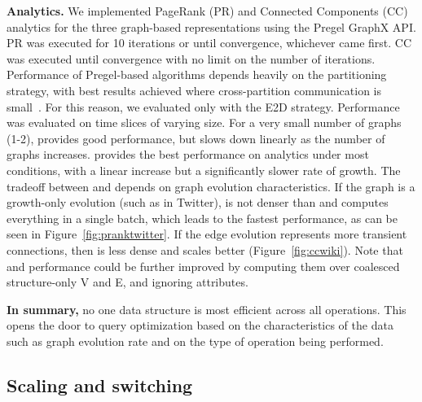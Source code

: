 {\bf Analytics.}  We implemented PageRank (PR) and Connected
Components (CC) analytics for the three graph-based representations
using the Pregel GraphX API.  PR was executed for 10 iterations or
until convergence, whichever came first. CC was executed until
convergence with no limit on the number of iterations.  Performance of
Pregel-based algorithms depends heavily on the partitioning strategy,
with best results achieved where cross-partition communication is
small~\cite{MoffittTempWeb16}.  For this reason, we evaluated only
with the E2D strategy.
%
Performance was evaluated on time slices of varying size.  For a very
small number of graphs (1-2), \sg provides good performance, but slows
down linearly as the number of graphs increases.  \hg provides the
best performance on analytics under most conditions, with a linear
increase but a significantly slower rate of growth.  The tradeoff
between \og and \hg depends on graph evolution characteristics.  If
the graph is a growth-only evolution (such as in Twitter), \og is not
denser than \hg and computes everything in a single batch, which leads
to the fastest performance, as can be seen in
Figure~\ref{fig:pranktwitter}.  If the edge evolution represents more
transient connections, then \hg is less dense and scales better
(Figure~\ref{fig:ccwiki}).  Note that \og and \hg performance could be
further improved by computing them over coalesced structure-only V and
E, and ignoring attributes.

{\bf In summary,} no one data structure is most efficient across all
operations.  This opens the door to query optimization based on the
characteristics of the data such as graph evolution rate and on the
type of operation being performed.  

\subsection{Scaling and switching}
\label{sec:exp:scale}

